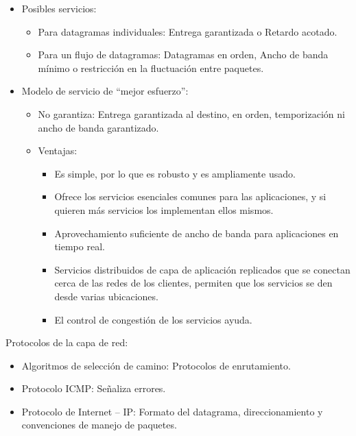 \documentclass[12pt, twoside, openright]{report} %
\begin{document}
    \begin{itemize}
    \item
      Posibles servicios:

      \begin{itemize}
      \item
        Para datagramas individuales: Entrega garantizada o Retardo
        acotado.
      \item
        Para un flujo de datagramas: Datagramas en orden, Ancho de banda
        mínimo o restricción en la fluctuación entre paquetes.
      \end{itemize}
    \item
      Modelo de servicio de ``mejor esfuerzo'':

      \begin{itemize}
      \item
        No garantiza: Entrega garantizada al destino, en orden,
        temporización ni ancho de banda garantizado.
      \item
        Ventajas:

        \begin{itemize}
        \item
          Es simple, por lo que es robusto y es ampliamente usado.
        \item
          Ofrece los servicios esenciales comunes para las aplicaciones,
          y si quieren más servicios los implementan ellos mismos.
        \item
          Aprovechamiento suficiente de ancho de banda para aplicaciones
          en tiempo real.
        \item
          Servicios distribuidos de capa de aplicación replicados que se
          conectan cerca de las redes de los clientes, permiten que los
          servicios se den desde varias ubicaciones.
        \item
          El control de congestión de los servicios ayuda.
        \end{itemize}
      \end{itemize}
    \end{itemize}

	Protocolos de la capa de red:

    \begin{itemize}
    \item
      Algoritmos de selección de camino: Protocolos de enrutamiento.
    \item
      Protocolo ICMP: Señaliza errores.
    \item
      Protocolo de Internet -- IP: Formato del datagrama,
      direccionamiento y convenciones de manejo de paquetes.
    \end{itemize}
\end{document}
